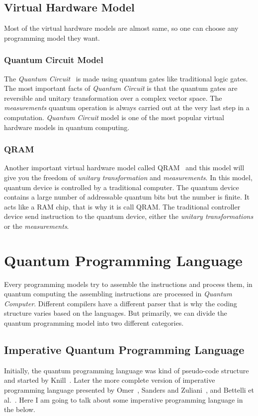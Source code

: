 \documentclass[11pt, conference, onecolumn]{IEEEtran}
\begin{document}
\subsection{Virtual Hardware Model}
Most of the virtual hardware models are almost same, so one can choose any programming model they want.

\subsubsection{Quantum Circuit Model}
The \textit{Quantum Circuit}~\cite{yao1993quantum} is made using quantum gates like traditional logic gates. The most important facts of \textit{Quantum Circuit} is that the quantum gates 
are reversible and unitary transformation over a complex vector space. The \textit{measurements} quantum operation is always carried out at the very last step in a computation. 
\textit{Quantum Circuit} model is one of the most popular virtual hardware models in quantum computing.

\subsubsection{QRAM}
Another important virtual hardware model called QRAM~\cite{knill1996conventions} and this model will give you the freedom of  \textit{unitary transformation} and \textit{measurements}. 
In this model, quantum device is controlled by a traditional computer. The quantum device contains a large number of addressable quantum bits but the number is finite. It acts like a 
RAM chip, that is why it is call QRAM. The traditional controller device send instruction to the quantum device, either the \textit{unitary transformations} or the \textit{measurements}.

\section{Quantum Programming Language}
Every programming models try to assemble the instructions and process them, in quantum computing the assembling instructions are processed in \textit{Quantum Computer}. Different compilers 
have a different parser that is why the coding structure varies based on the languages. But primarily, we can divide the quantum programming model into two different categories.  

\subsection{Imperative Quantum Programming Language}
Initially, the quantum programming language was kind of pseudo-code structure and started by Knill~\cite{knill1996conventions}. Later the more complete version of imperative programming language 
presented by Omer~\cite{omer1998procedural}, Sanders and Zuliani~\cite{sanders2000quantum}, and Bettelli et al.~\cite{bettelli2003toward}. Here I am going to talk about some 
imperative programming language in the below.
\end{document}
